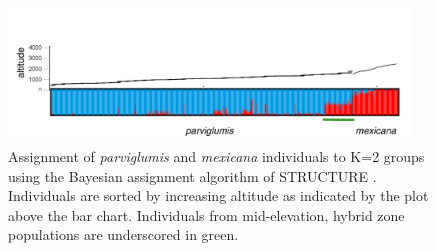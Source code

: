 \begin{figure}[h!] 
  \centering
   \includegraphics[width=0.95\textwidth]{structure.pdf}
    \caption{Assignment of \emph{parviglumis} and \emph{mexicana} individuals to K=2 groups using the Bayesian assignment algorithm of STRUCTURE \citep{Pritchard2000}.  Individuals are sorted by increasing altitude as indicated by the plot above the bar chart. Individuals from mid-elevation, hybrid zone populations are underscored in green.} 
\label{fig:structure}
\end{figure}

